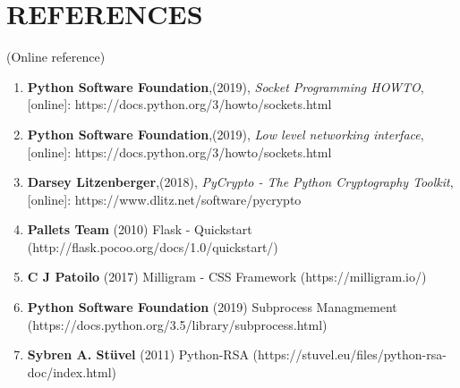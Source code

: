 \chapter*{\rm \large \bf REFERENCES}
\vspace{4.0mm}
\setlength{\parindent}{1cm} 

\scriptsize{(Online reference)}
\begin{enumerate}
    \item \textbf{Python Software Foundation},(2019),
        \textit{Socket Programming HOWTO},\\
        \hspace{15mm}[online]: https://docs.python.org/3/howto/sockets.html

    \item \textbf{Python Software Foundation},(2019),
        \textit{Low level networking interface},\\
        \hspace{15mm}[online]: https://docs.python.org/3/howto/sockets.html

    \item \textbf{Darsey Litzenberger},(2018),
        \textit{PyCrypto - The Python Cryptography Toolkit},\\
        \hspace{15mm}[online]: https://www.dlitz.net/software/pycrypto

    \item \textbf{Pallets Team} (2010) Flask - Quickstart
        (http://flask.pocoo.org/docs/1.0/quickstart/)

    \item \textbf{C J Patoilo} (2017) Milligram - CSS Framework
        (https://milligram.io/)

    \item \textbf{Python Software Foundation} (2019) Subprocess Managmement
        (https://docs.python.org/3.5/library/subprocess.html)

    \item \textbf{Sybren A. Stüvel} (2011) Python-RSA
        (https://stuvel.eu/files/python-rsa-doc/index.html)
\end{enumerate}

